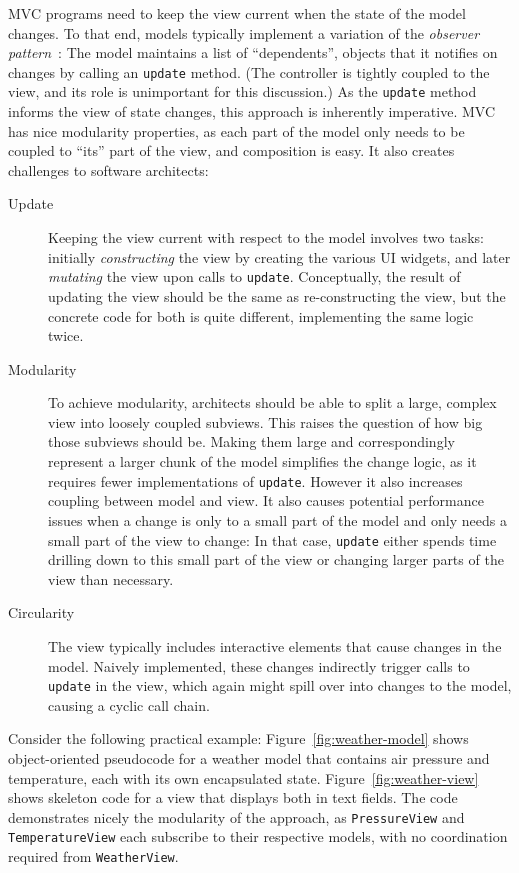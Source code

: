 \documentclass[sigplan,screen]{acmart}
\begin{document}
MVC programs need to keep the view current when the state of the model
changes.  To that end, models typically implement a variation of the
\textit{observer pattern}~\cite{GoF}: The model maintains a list of
``dependents'', objects that it notifies on changes by calling
an \texttt{update} method.  (The controller is tightly coupled to the
view, and its role is unimportant for this discussion.)
As the \texttt{update} method informs the view of state changes, this
approach is inherently imperative.  MVC has nice modularity
properties, as each part of the model only needs to be coupled to
``its'' part of the view, and composition is easy.
It also creates challenges to
software architects:
\label{sec:challenges}
%
\begin{description}
\item[\hypertarget{challenge:update}{Update}] Keeping the view current with respect to the model involves two
  tasks: initially \emph{constructing} the view by creating the
  various UI widgets, and later \emph{mutating} the view upon calls to
  \texttt{update}.  Conceptually, the result of updating the view
  should be the same as re-constructing the view, but the concrete
  code for both is quite different, implementing the same logic twice.
\item[\hypertarget{challenge:modularity}{Modularity}] To achieve modularity, architects should be able to split a large,
  complex view into loosely coupled subviews.  This raises the
  question of how big those subviews should be. Making them large and
  correspondingly represent a larger chunk of the model
  simplifies the change logic, as it requires fewer implementations of
  \texttt{update}. However it also increases coupling between model
  and view.  It also causes potential performance issues when 
  a change is only to a small part of the model and only needs a
  small part of the view to change: In that case, \texttt{update}
  either spends time drilling down to this small part of the view or
  changing larger parts of the view than necessary.
\item[\hypertarget{challenge:circularity}{Circularity}] The view typically
  includes interactive elements that cause changes in the model.
  Naively implemented, these changes indirectly trigger calls to
  \texttt{update} in the view, which again might spill over into
  changes to the model, causing a cyclic call chain.
\end{description}
%
%
Consider the following practical example:
Figure~\ref{fig:weather-model} shows object-oriented pseudocode for a
weather model that contains air pressure and temperature, each with
its own encapsulated state.  Figure~\ref{fig:weather-view} shows
skeleton code for a view that displays both in text fields.  The code
demonstrates nicely the modularity of the approach, as
\texttt{PressureView} and \texttt{TemperatureView} each subscribe to
their respective models, with no coordination required from
\texttt{WeatherView}.
\end{document}
